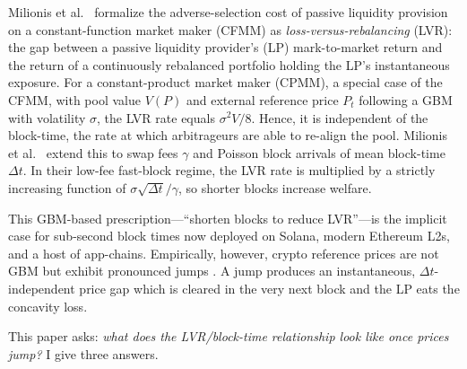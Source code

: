 \documentclass[runningheads]{llncs}
\newcommand{\dt}{\Delta t}
\newcommand{\1}{\mathbf{1}}
\begin{document}
Milionis et al.~\cite{milionis2022automated} formalize the adverse-selection cost of passive liquidity provision on a constant-function market maker (CFMM) as \emph{loss-versus-rebalancing} (LVR): the gap between a passive liquidity provider's (LP) mark-to-market return and the return of a continuously rebalanced portfolio holding the LP's instantaneous exposure. For a constant-product market maker (CPMM), a special case of the CFMM, with pool value $V(P)$ and external reference price $P_t$ following a GBM with volatility $\sigma$, the LVR rate equals $\sigma^2 V/8$. Hence, it is independent of the block-time, the rate at which arbitrageurs are able to re-align the pool. Milionis et al.~\cite{milionis2023automated} extend this to swap fees $\gamma$ and Poisson block arrivals of mean block-time $\dt$. In their low-fee fast-block regime, the LVR rate is multiplied by a strictly increasing function of $\sigma\sqrt{\dt}/\gamma$, so shorter blocks increase welfare.

This GBM-based prescription---``shorten blocks to reduce LVR''---is the implicit case for sub-second block times now deployed on Solana, modern Ethereum L2s, and a host of app-chains. Empirically, however, crypto reference prices are not GBM but exhibit pronounced jumps \cite{scaillet2020high,chaim2019nonlinear,saef2024temporal}. A jump produces an instantaneous, $\dt$-independent price gap which is cleared in the very next block and the LP eats the concavity loss.

This paper asks: \emph{what does the LVR/block-time relationship look like once prices jump?} I give three answers.
\end{document}
